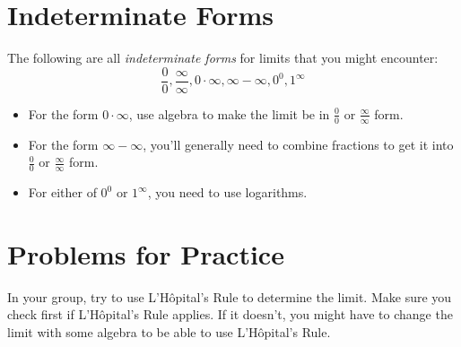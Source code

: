 \documentclass{ximera}
\begin{document}
\section*{Indeterminate Forms}

The following are all \emph{indeterminate forms} for limits that you might encounter:
\[
    \frac{0}{0}, \frac{\infty}{\infty}, 0 \cdot \infty, \infty - \infty, 0^0, 1^{\infty}
\]

\begin{itemize}
\item For the form $0 \cdot \infty$, use algebra to make the limit be in $\frac{0}{0}$ or $\frac{\infty}{\infty}$ form.

\item For the form $\infty - \infty$, you'll generally need to combine fractions to get it into $\frac{0}{0}$ or $\frac{\infty}{\infty}$ form.

\item For either of $0^0$ or $1^{\infty}$, you need to use logarithms.

\end{itemize}

\section{Problems for Practice}

In your group, try to use L'H\^{o}pital's Rule to determine the limit. Make sure you check first if L'H\^{o}pital's Rule applies. If it doesn't, you might have to change the limit with some algebra to be able to use L'H\^{o}pital's Rule.
\end{document}

